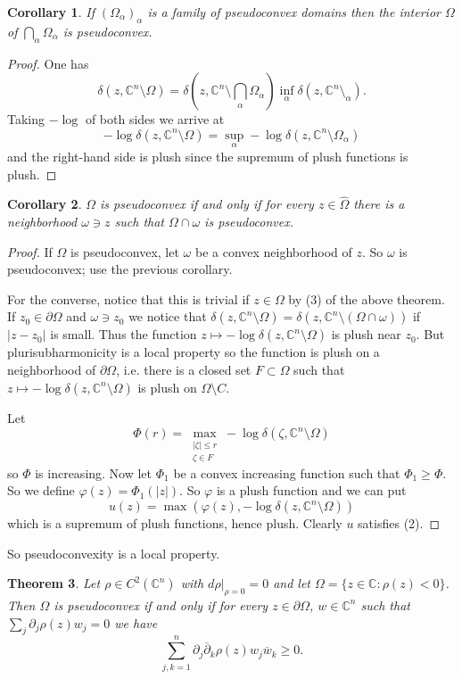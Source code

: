 \documentclass[12pt]{report}
\newcommand{\CC}{\mathbb{C}}
\newcommand{\dbar}{\overline \partial}
\newtheorem{theorem}{Theorem}[chapter]
\newtheorem{corollary}[theorem]{Corollary}
\theoremstyle{definition}
\begin{document}
\begin{corollary}
    If $(\Omega_\alpha)_\alpha$ is a family of pseudoconvex domains then the interior $\Omega$ of $\bigcap_\alpha \Omega_\alpha$ is pseudoconvex.
\end{corollary}
\begin{proof}
    One has
    $$\delta(z, \CC^n \setminus \Omega) = \delta\left(z, \CC^n \setminus \bigcap_\alpha \Omega_\alpha\right) \inf_\alpha \delta(z, \CC^n \setminus_\alpha).$$
    Taking $-\log$ of both sides we arrive at
    $$-\log \delta(z, \CC^n \setminus \Omega) = \sup_\alpha -\log \delta(z, \CC^n \setminus \Omega_\alpha)$$
    and the right-hand side is plush since the supremum of plush functions is plush.
\end{proof}
\begin{corollary}
    $\Omega$ is pseudoconvex if and only if for every $z \in \hat \Omega$ there is a neighborhood $\omega \ni z$ such that $\Omega \cap \omega$ is pseudoconvex.
\end{corollary}
\begin{proof}
    If $\Omega$ is pseudoconvex, let $\omega$ be a convex neighborhood of $z$. So $\omega$ is pseudoconvex; use the previous corollary.

    For the converse, notice that this is trivial if $z \in \Omega$ by (3) of the above theorem. If $z_0 \in \partial \Omega$ and $\omega \ni z_0$ we notice that $\delta(z, \CC^n \setminus \Omega) = \delta(z, \CC^n \setminus (\Omega \cap \omega))$ if $|z - z_0|$ is small. Thus the function $z \mapsto -\log \delta(z, \CC^n \setminus \Omega)$ is plush near $z_0$. But plurisubharmonicity is a local property so the function is plush on a neighborhood of $\partial \Omega$, i.e. there is a closed set $F \subset \Omega$ such that $z \mapsto -\log \delta(z, \CC^n \setminus \Omega)$ is plush on $\Omega \setminus C$. 

    Let
    $$\Phi(r) = \max_{\substack{|\zeta| \leq r\\\zeta \in F}} -\log \delta(\zeta, \CC^n \setminus \Omega)$$
    so $\Phi$ is increasing. Now let $\Phi_1$ be a convex increasing function such that $\Phi_1 \geq \Phi$. So we define $\varphi(z) = \Phi_1(|z|)$. So $\varphi$ is a plush function and we can put
    $$u(z) = \max(\varphi(z), -\log\delta(z, \CC^n\setminus\Omega))$$
    which is a supremum of plush functions, hence plush. Clearly $u$ satisfies (2). 
\end{proof}
    So pseudoconvexity is a local property.
\begin{theorem}
    \label{Levi condition}
    Let $\rho \in C^2(\CC^n)$ with $d\rho|_{\rho = 0} = 0$ and let $\Omega = \{z \in \CC: \rho(z) < 0\}$. Then $\Omega$ is pseudoconvex if and only if for every $z \in \partial \Omega$, $w \in \CC^n$ such that $\sum_j \partial_j \rho(z) w_j = 0$
    we have
    $$\sum_{j,k=1}^n \partial_j \dbar_k \rho(z) w_j \overline w_k \geq 0.$$
\end{theorem}
\end{document}
